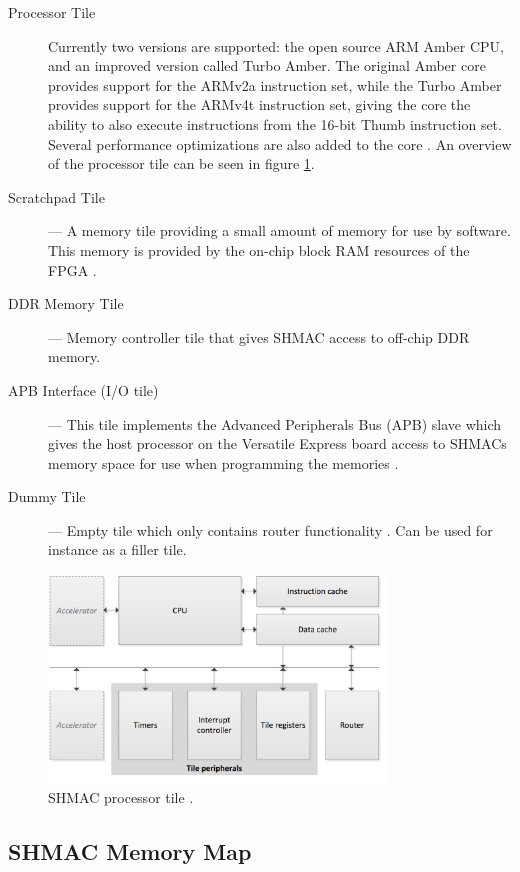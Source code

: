 \begin{description}
  \item[Processor Tile] Currently two versions are supported: the open source ARM Amber CPU, and an improved version called Turbo Amber.
  	The original Amber core provides support for the ARMv2a instruction set, while the Turbo Amber
	provides support for the ARMv4t instruction set, giving the core the ability to also execute
	instructions from the 16-bit Thumb instruction set. Several performance optimizations are
	also added to the core \cite{turboamber}. An overview of the processor tile can be seen in
	figure \ref{fig:shmac-cpu}.
  \item[Scratchpad Tile] --- A memory tile providing a small amount of memory for use by software.
  	This memory is provided by the on-chip block RAM resources of the FPGA \cite{shmac-plan}.
  \item[DDR Memory Tile] --- Memory controller tile that gives SHMAC access to off-chip DDR memory.
  \item[APB Interface (I/O tile)] --- This tile implements the Advanced Peripherals Bus (APB) slave
  	which gives the host processor on the Versatile Express board access to SHMACs memory space
	for use when programming the memories \cite{shmac-plan}.
  \item[Dummy Tile] --- Empty tile which only contains router functionality \cite{shmac-plan}. Can be used for instance
  	as a filler tile.
\end{description}

\begin{figure}[htb]
    \centering
    \includegraphics[width=0.8\textwidth]{Figures/Heterogeneous/SHMACCPU}
    \caption{SHMAC processor tile \cite{shmac-plan}.}
    \label{fig:shmac-cpu}
\end{figure}

\subsection{SHMAC Memory Map}

